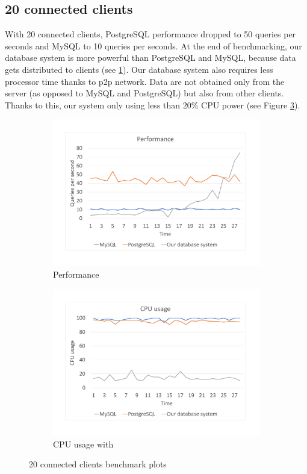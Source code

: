 \subsection*{20 connected clients}
With 20 connected clients, PostgreSQL performance dropped to 50 queries per seconds and MySQL to 10 queries per seconds. At the end of benchmarking, our database system is more powerful than PostgreSQL and MySQL, because data gets distributed to clients (see \ref{bench20per}). Our database system also requires less processor time thanks to p2p network. Data are not obtained only from the server (as opposed to MySQL and PostgreSQL) but also from other clients. Thanks to this, our system only using less than 20\% CPU power (see Figure \ref{bench20cpu}).

\begin{figure}[h]
    \begin{subfigure}{.5\textwidth}
        \centering
        \includegraphics[trim={1.78cm 2cm 2.08cm 1cm},clip,width=1.0\linewidth]{excel/20per.pdf}
        \caption{Performance}
        \label{bench20per}
    \end{subfigure}
    \begin{subfigure}{.5\textwidth}
        \centering
        \includegraphics[trim={1.78cm 2cm 2.08cm 1cm},clip,width=1.0\linewidth]{excel/20cpu.pdf}
        \caption{CPU usage with}
        \label{bench20cpu}
    \end{subfigure}
    \caption{20 connected clients benchmark plots}
\end{figure}



